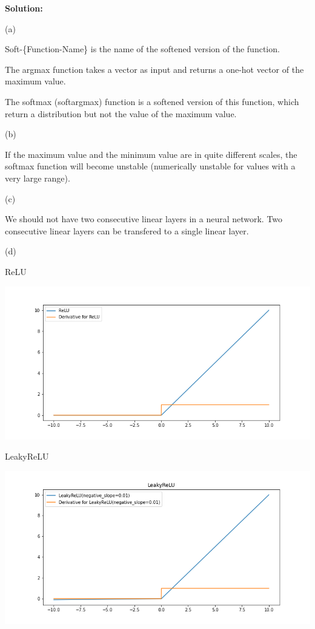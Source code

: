 \textbf{Solution:}

(a)

Soft-\{Function-Name\} is the name of the softened version of the function.

The argmax function takes a vector as input and returns a one-hot vector of the maximum value.

The softmax (softargmax) function is a softened version of this function, which return a distribution but not the value of the maximum value.


(b)

If the maximum value and the minimum value are in quite different scales, the softmax function will become unstable (numerically unstable for values with a very large range). 

(c)

We should not have two consecutive linear layers in a neural network. Two consecutive linear layers can be transfered to a single linear layer.


(d)


ReLU 

\includegraphics[width=\linewidth]{./imgs/relu.png}

LeakyReLU

\includegraphics[width=\linewidth]{./imgs/leakyrelu.png}


